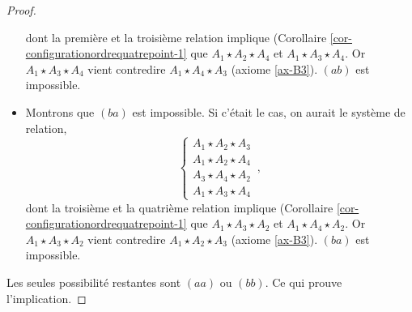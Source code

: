 \begin{cor}
\begin{proof}
\begin{itemize}[$\bullet$]
            dont la première et la troisième relation implique (Corollaire \ref{cor-configurationordrequatrepoint-1} que $A_1 \star A_2 \star A_4$ et $A_1 \star A_3 \star A_4$. Or $A_1 \star A_3 \star A_4$ vient contredire $A_1 \star A_4 \star A_3$ (axiome \ref{ax-B3}). $(ab)$ est impossible.
            \item Montrons que $(ba)$ est impossible. Si c'était le cas, on aurait le système de relation,
            \begin{equation*}
                \left\{\begin{array}{cc}
                     A_1 \star A_2 \star A_3  \\
                     A_1 \star A_2 \star A_4  \\
                     A_3 \star A_4 \star A_2 \\
                     A_1 \star A_3 \star A_4
                \end{array}\right.\,,
            \end{equation*}
            dont la troisième et la quatrième relation implique (Corollaire \ref{cor-configurationordrequatrepoint-1} que $A_1 \star A_3 \star A_2$ et $A_1 \star A_4 \star A_2$. Or $A_1 \star A_3 \star A_2$ vient contredire $A_1 \star A_2 \star A_3$ (axiome \ref{ax-B3}). $(ba)$ est impossible.
        \end{itemize}
        Les seules possibilité restantes sont $(aa)$ ou $(bb)$. Ce qui prouve l'implication.
    \end{proof}
\end{cor}
